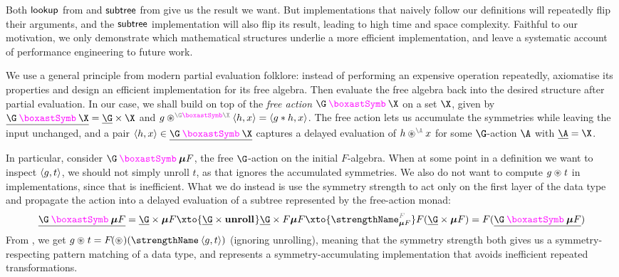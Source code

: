 Both $\mathsf{lookup}$ from  and $\mathsf{subtree}$
from  give us the result we want. But
implementations that naively follow our definitions
will repeatedly flip their arguments, and the
$\mathsf{subtree}$ implementation will also flip its result, leading to high time and space
complexity. Faithful to our motivation, we only demonstrate which
mathematical structures underlie a more efficient implementation, and
leave a systematic account of performance engineering to future work.

We use a general principle from modern partial evaluation folklore:
instead of performing an expensive operation repeatedly, axiomatise
its properties and design an efficient implementation for its free
algebra. Then evaluate the free algebra back into the desired
structure after partial evaluation. In our case, we shall build on top
of the \emph{free action} $\gast \X$ on a set $\X$, given by
$\carrier{\gast \X} = \carrier \G \times \X$ and $g \act[\gast \X]
\pair h x = \pair {g \mul h} x$. The free action lets us
accumulate the symmetries while leaving the input unchanged, and a
pair $\pair h x \in \carrier{\gast \X}$ captures a delayed evaluation
of $h \act[\A] x$ for some $\G$-action $\A$ with $\carrier{\A} = \X$.

In particular, consider $\gast \fix F$, the free $\G$-action on
the initial $F$-algebra. When at some point in a definition we want to
inspect $\left<{g}, {t}\right>$, we should not simply unroll $t$, as that ignores the
accumulated symmetries. We also do not want to compute $g \act t$
in implementations, since that is inefficient. What we do instead is use the symmetry
strength to act only on the first layer of the data type and
propagate the action into a delayed evaluation of a subtree
represented by the free-action monad:
\[
  \carrier{\gast \fix F}
  =
  \carrier \G \times \fix F
  \xto{\carrier\G \times \unroll}
  \carrier \G \times F \fix F
  \xto{\gstrength[F]_{\fix F}}
  F (\carrier \G \times \fix F)
  =
  F (\carrier{\gast \fix F})
\]
From , we get $g \act t =
\fmap(\act)(\strength \pair g t)$ (ignoring unrolling), meaning that
the symmetry strength both gives us a symmetry-respecting pattern
matching of a data type, and represents a symmetry-accumulating implementation that
avoids inefficient repeated
transformations.

